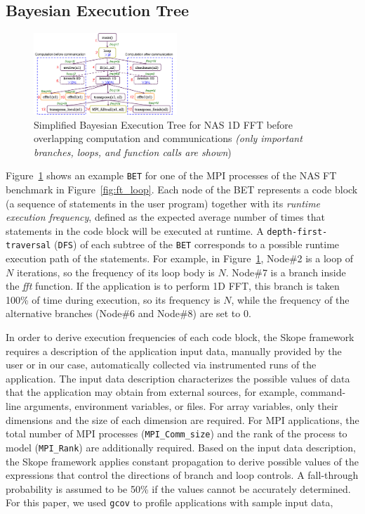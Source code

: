 \subsection {Bayesian Execution Tree}

\begin{figure}[h]
\begin{center}
\includegraphics[width=0.48\textwidth]{fig/ft_bet.png}
\caption{Simplified Bayesian Execution Tree for NAS 1D FFT before
  overlapping computation and communications \emph{(only important branches, loops, and function calls are shown})}
\label{fig:ft_bet}
\end{center}
\end{figure}

Figure~\ref{fig:ft_bet} shows an example \texttt{BET} for one of the
MPI processes of the NAS FT benchmark in Figure~\ref{fig:ft_loop}.
Each node of the BET represents a code block (a sequence of statements
in the user program) together with its \emph{runtime execution
  frequency}, defined as the expected average number of times that
statements in the code block will be executed at runtime.  A
\texttt{depth-first-traversal} (\texttt{DFS}) of each subtree of the
\texttt{BET} corresponds to a possible runtime execution path of the
statements.  For example, in Figure~\ref{fig:ft_bet}, Node\#2 is a
loop of $N$ iterations, so the frequency of its loop body is $N$.
Node\#7 is a branch inside the {\em fft} function. If the application is
to perform 1D FFT, this branch is taken 100\% of time during
execution, so its frequency is $N$, while the frequency of the
alternative branches (Node\#6 and Node\#8) are set to 0.

In order to derive execution frequencies of each code block, the Skope
framework requires a description of the application input data,
manually provided by the user or in our case,  automatically collected via 
instrumented runs of the application.  The input data description
characterizes the possible values of data that the application
may obtain from external sources, for example, command-line arguments,
environment variables, or files.  For array variables, only their
dimensions and the size of each dimension are required.  For MPI
applications, the total number of MPI processes
(\texttt{MPI\_Comm\_size}) and the rank of the process to model
(\texttt{MPI\_Rank}) are additionally required.  Based on the input
data description, the Skope framework applies constant propagation to
derive possible values of the expressions that control the directions
of branch and loop controls. A fall-through probability is assumed to be 50\% if the values cannot be accurately determined.  For this
paper, we used \texttt{gcov} to profile applications with sample input
data,


